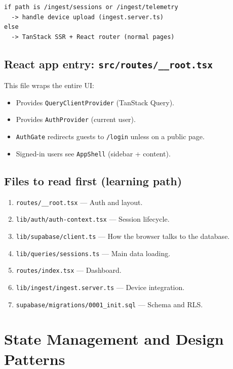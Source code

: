 \documentclass[11pt,a4paper]{article}
\newcommand{\filepath}[1]{\texttt{#1}}
\begin{document}
\begin{lstlisting}
if path is /ingest/sessions or /ingest/telemetry
  -> handle device upload (ingest.server.ts)
else
  -> TanStack SSR + React router (normal pages)
\end{lstlisting}

\subsection{React app entry: \filepath{src/routes/\_\_root.tsx}}

This file wraps the entire UI:

\begin{itemize}[leftmargin=*]
  \item Provides \texttt{QueryClientProvider} (TanStack Query).
  \item Provides \texttt{AuthProvider} (current user).
  \item \texttt{AuthGate} redirects guests to \filepath{/login} unless on a public page.
  \item Signed-in users see \texttt{AppShell} (sidebar + content).
\end{itemize}

\subsection{Files to read first (learning path)}

\begin{enumerate}[leftmargin=*]
  \item \filepath{routes/\_\_root.tsx} --- Auth and layout.
  \item \filepath{lib/auth/auth-context.tsx} --- Session lifecycle.
  \item \filepath{lib/supabase/client.ts} --- How the browser talks to the database.
  \item \filepath{lib/queries/sessions.ts} --- Main data loading.
  \item \filepath{routes/index.tsx} --- Dashboard.
  \item \filepath{lib/ingest/ingest.server.ts} --- Device integration.
  \item \filepath{supabase/migrations/0001\_init.sql} --- Schema and RLS.
\end{enumerate}

\section{State Management and Design Patterns}
\end{document}
